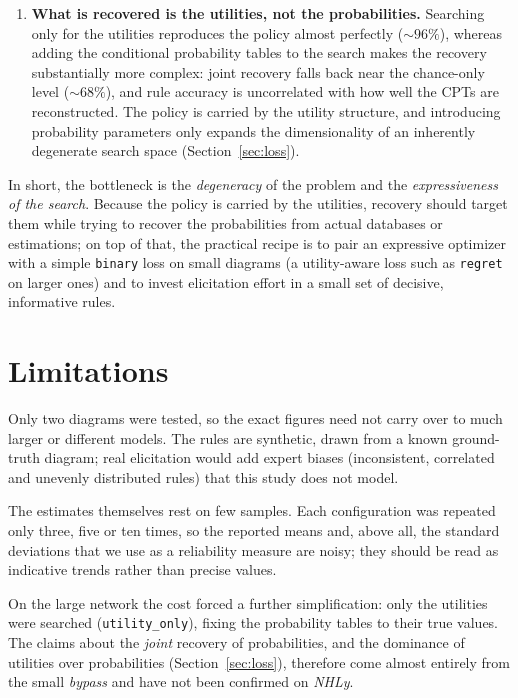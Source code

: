 \begin{enumerate}
      \item \textbf{What is recovered is the utilities, not the probabilities.}
        Searching only for the utilities reproduces the policy almost perfectly
        ($\sim\!96\%$), whereas adding the conditional probability tables to the
        search makes the recovery substantially more complex: joint recovery falls back near the chance-only level ($\sim\!68\%$), and rule accuracy is uncorrelated with
        how well the CPTs are reconstructed. The policy is carried by the
        utility structure, and introducing probability parameters only expands the dimensionality of an inherently degenerate search space (Section~\ref{sec:loss}).
    
\end{enumerate}

In short, the bottleneck is the \emph{degeneracy} of the problem and the
\emph{expressiveness of the search}. Because the policy is carried by the
utilities, recovery should target them while trying to recover the probabilities from actual databases or estimations; on top
of that, the practical recipe is to pair an expressive optimizer with a simple
\texttt{binary} loss on small diagrams (a utility-aware loss such as
\texttt{regret} on larger ones) and to invest elicitation effort in a small set
of decisive, informative rules.

\section{Limitations}
\label{sec:limitations}

Only two diagrams were tested, so the exact figures need not carry over to much
larger or different models. The rules are synthetic, drawn from a known
ground-truth diagram; real elicitation would add expert biases (inconsistent,
correlated and unevenly distributed rules) that this study does not model.

The estimates themselves rest on few samples. Each configuration was repeated
only three, five or ten times, so the reported means and, above all, the
standard deviations that we use as a reliability measure are noisy; they should
be read as indicative trends rather than precise values.

On the large network the cost forced a further simplification: only the
utilities were searched (\texttt{utility\_only}), fixing the probability tables
to their true values. The claims about the \emph{joint} recovery of
probabilities, and the dominance of utilities over probabilities
(Section~\ref{sec:loss}), therefore come almost entirely from the small
\emph{bypass} and have not been confirmed on \emph{NHLy}.


